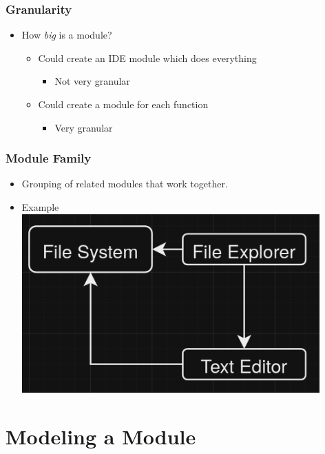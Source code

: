 \begin{frame}
  \frametitle{Granularity}
  \begin{itemize}
    \item How \textit{big} is a module?
    \begin{itemize}
      \item Could create an IDE module which does everything
      \begin{itemize}
        \item Not very granular
      \end{itemize}
      \item Could create a module for each function
      \begin{itemize}
        \item Very granular
      \end{itemize}
    \end{itemize}
  \end{itemize}
\end{frame}

\begin{frame}
  \frametitle{Module Family}
  \begin{itemize}
    \item Grouping of related modules that work together.
    \item Example
    \includegraphics[width=0.9\textwidth]{./pics/ide-family.png}
  \end{itemize}
\end{frame}

\section{Modeling a Module}
\SectionPage

